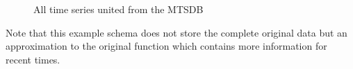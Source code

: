 \begin{figure}[tp]
  \centering
  
  \caption{All time series united from the MTSDB}
  \label{fig:exemple:4mrdtot}
\end{figure}

Note that this  example schema does not store the complete
original data but an approximation to the original function which
contains more information for recent times.



